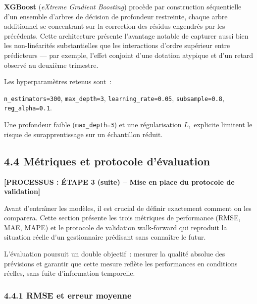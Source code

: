 \textbf{XGBoost} (\textit{eXtreme Gradient Boosting}) proc\`ede par construction
s\'equentielle d'un ensemble d'arbres de d\'ecision de profondeur restreinte, chaque
arbre additionnel se concentrant sur la correction des r\'esidus engendr\'es par les
pr\'ec\'edents. Cette architecture pr\'esente l'avantage notable de capturer aussi bien
les non-lin\'earit\'es substantielles que les interactions d'ordre sup\'erieur entre
pr\'edicteurs --- par exemple, l'effet conjoint d'une dotation atypique et d'un retard
observ\'e au deuxi\`eme trimestre.

Les hyperparam\`etres retenus sont~:
\begin{center}
\texttt{n\_estimators=300}, \texttt{max\_depth=3},
\texttt{learning\_rate=0.05}, \texttt{subsample=0.8}, \texttt{reg\_alpha=0.1}.
\end{center}

\noindent
Une profondeur faible (\texttt{max\_depth=3}) et une r\'egularisation $L_1$ explicite
limitent le risque de surapprentissage sur un \'echantillon r\'eduit.

\subsection*{4.4 \quad M\'etriques et protocole d'\'evaluation}

\textbf{[PROCESSUS : \'ETAPE 3 (suite) -- Mise en place du protocole de validation]}

\noindent Avant d'entra\^{\i}ner les mod\`eles, il est crucial de d\'efinir exactement
comment on les comparera. Cette section pr\'esente les trois m\'etriques de
performance (RMSE, MAE, MAPE) et le protocole de validation walk-forward qui
reproduit la situation r\'eelle d'un gestionnaire pr\'edisant sans connaître le
futur.

L'\'evaluation poursuit un double objectif~: mesurer la qualit\'e absolue des
pr\'evisions et garantir que cette mesure refl\`ete les performances en conditions
r\'eelles, sans fuite d'information temporelle.

\subsubsection*{4.4.1 \quad RMSE et erreur moyenne}

